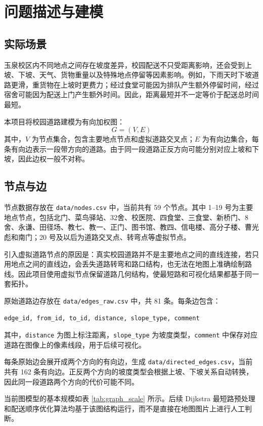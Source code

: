 \documentclass[12pt,a4paper,UTF8]{article}
\begin{document}
\section{问题描述与建模}

\subsection{实际场景}

玉泉校区内不同地点之间存在坡度差异，校园配送不只受距离影响，还会受到上坡、下坡、天气、货物重量以及特殊地点停留等因素影响。例如，下雨天时下坡道路更滑，重货物在上坡时更费力；经过食堂可能因为排队产生额外停留时间，经过宿舍可能因为配送上门产生额外时间。因此，距离最短并不一定等价于配送总时间最短。

本项目将校园道路建模为有向加权图：
\[
    G=(V,E)
\]
其中，$V$ 为节点集合，包含主要地点节点和虚拟道路交叉点；$E$ 为有向边集合，每条有向边表示一段带方向的道路。由于同一段道路正反方向可能分别对应上坡和下坡，因此边权一般不对称。

\subsection{节点与边}

节点数据存放在 \texttt{data/nodes.csv} 中，当前共有 59 个节点。其中 1--19 号为主要地点节点，包括北门、菜鸟驿站、32舍、校医院、四食堂、三食堂、新桥门、8舍、永谦、田径场、教七、教一、正门、图书馆、教四、信电楼、高分子楼、曹光彪和南门；20 号及以后为道路交叉点、转弯点等虚拟节点。

引入虚拟道路节点的原因是：真实校园道路并不是主要地点之间的直线连接，若只用地点之间的直线边，会丢失道路转弯和路口结构，也无法在地图上准确绘制路线。因此项目使用虚拟节点保留道路几何结构，使最短路和可视化结果都基于同一套拓扑。

原始道路边存放在 \texttt{data/edges\_raw.csv} 中，共 81 条。每条边包含：
\begin{verbatim}
edge_id, from_id, to_id, distance, slope_type, comment
\end{verbatim}
其中，\verb|distance| 为图上标注距离，\verb|slope_type| 为坡度类型，\verb|comment| 中保存对应道路在图像上的像素线段，用于后续可视化。

每条原始边会展开成两个方向的有向边，生成 \texttt{data/directed\_edges.csv}，当前共有 162 条有向边。正反两个方向的坡度类型会根据上坡、下坡关系自动转换，因此同一段道路两个方向的代价可能不同。

当前图模型的基本规模如表 \ref{tab:graph_scale} 所示。后续 Dijkstra 最短路预处理和配送顺序优化算法均基于该图结构运行，而不是直接在地图图片上进行人工判断。
\end{document}
